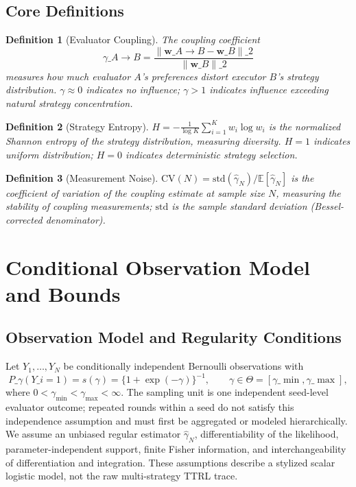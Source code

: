 \documentclass[11pt]{article}
\newtheorem{definition}{Definition}
\begin{document}
\subsection{Core Definitions}

\begin{definition}[Evaluator Coupling]
The coupling coefficient
\[
\gamma\_{A \to B} =
\frac{\|\mathbf{w}\_{A \to B} - \mathbf{w}\_B\|\_2}{\|\mathbf{w}\_B\|\_2}
\]
measures how much evaluator $A$'s preferences distort executor $B$'s strategy distribution. $\gamma \approx 0$ indicates no influence; $\gamma > 1$ indicates influence exceeding natural strategy concentration.
\end{definition}

\begin{definition}[Strategy Entropy]
$H = -\frac{1}{\log K}\sum_{i=1}^K w_i \log w_i$ is the normalized Shannon entropy of the strategy distribution, measuring diversity. $H = 1$ indicates uniform distribution; $H = 0$ indicates deterministic strategy selection.
\end{definition}

\begin{definition}[Measurement Noise]
$\mathrm{CV}(N) = \text{std}(\hat{\gamma}_N) / \mathbb{E}[\hat{\gamma}_N]$ is the coefficient of variation of the coupling estimate at sample size $N$, measuring the stability of coupling measurements; $\text{std}$ is the sample standard deviation (Bessel-corrected denominator).
\end{definition}

\section{Conditional Observation Model and Bounds}

\subsection{Observation Model and Regularity Conditions}

Let $Y_1,\ldots,Y_N$ be conditionally independent Bernoulli observations with
\[
P\_\gamma(Y\_i=1)=s(\gamma)=\{1+\exp(-\gamma)\}^{-1},
\qquad \gamma\in\Theta=[\gamma\_{\min},\gamma\_{\max}],
\]
where $0<\gamma_{\min}<\gamma_{\max}<\infty$. The sampling unit is one independent seed-level evaluator outcome; repeated rounds within a seed do not satisfy this independence assumption and must first be aggregated or modeled hierarchically. We assume an unbiased regular estimator $\hat\gamma_N$, differentiability of the likelihood, parameter-independent support, finite Fisher information, and interchangeability of differentiation and integration. These assumptions describe a stylized scalar logistic model, not the raw multi-strategy TTRL trace.
\end{document}
